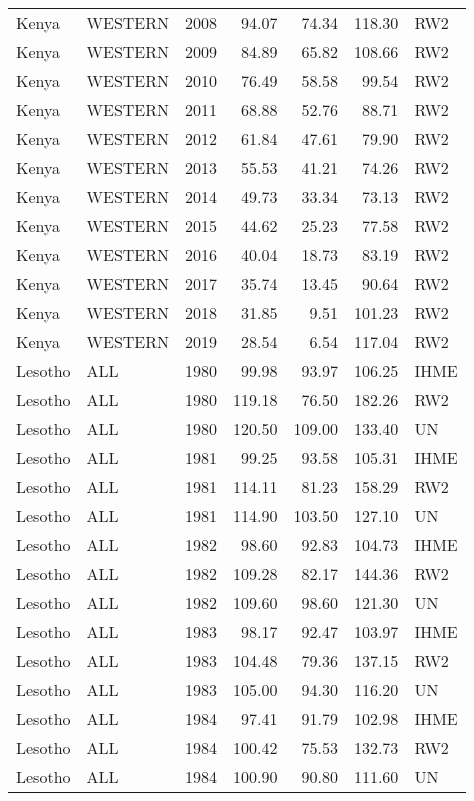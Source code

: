 \begin{longtable}{lllrrrl}
  Kenya & WESTERN & 2008 & 94.07 & 74.34 & 118.30 & RW2 \\ 
  Kenya & WESTERN & 2009 & 84.89 & 65.82 & 108.66 & RW2 \\ 
  Kenya & WESTERN & 2010 & 76.49 & 58.58 & 99.54 & RW2 \\ 
  Kenya & WESTERN & 2011 & 68.88 & 52.76 & 88.71 & RW2 \\ 
  Kenya & WESTERN & 2012 & 61.84 & 47.61 & 79.90 & RW2 \\ 
  Kenya & WESTERN & 2013 & 55.53 & 41.21 & 74.26 & RW2 \\ 
  Kenya & WESTERN & 2014 & 49.73 & 33.34 & 73.13 & RW2 \\ 
  Kenya & WESTERN & 2015 & 44.62 & 25.23 & 77.58 & RW2 \\ 
  Kenya & WESTERN & 2016 & 40.04 & 18.73 & 83.19 & RW2 \\ 
  Kenya & WESTERN & 2017 & 35.74 & 13.45 & 90.64 & RW2 \\ 
  Kenya & WESTERN & 2018 & 31.85 & 9.51 & 101.23 & RW2 \\ 
  Kenya & WESTERN & 2019 & 28.54 & 6.54 & 117.04 & RW2 \\ 
  Lesotho & ALL & 1980 & 99.98 & 93.97 & 106.25 & IHME \\ 
  Lesotho & ALL & 1980 & 119.18 & 76.50 & 182.26 & RW2 \\ 
  Lesotho & ALL & 1980 & 120.50 & 109.00 & 133.40 & UN \\ 
  Lesotho & ALL & 1981 & 99.25 & 93.58 & 105.31 & IHME \\ 
  Lesotho & ALL & 1981 & 114.11 & 81.23 & 158.29 & RW2 \\ 
  Lesotho & ALL & 1981 & 114.90 & 103.50 & 127.10 & UN \\ 
  Lesotho & ALL & 1982 & 98.60 & 92.83 & 104.73 & IHME \\ 
  Lesotho & ALL & 1982 & 109.28 & 82.17 & 144.36 & RW2 \\ 
  Lesotho & ALL & 1982 & 109.60 & 98.60 & 121.30 & UN \\ 
  Lesotho & ALL & 1983 & 98.17 & 92.47 & 103.97 & IHME \\ 
  Lesotho & ALL & 1983 & 104.48 & 79.36 & 137.15 & RW2 \\ 
  Lesotho & ALL & 1983 & 105.00 & 94.30 & 116.20 & UN \\ 
  Lesotho & ALL & 1984 & 97.41 & 91.79 & 102.98 & IHME \\ 
  Lesotho & ALL & 1984 & 100.42 & 75.53 & 132.73 & RW2 \\ 
  Lesotho & ALL & 1984 & 100.90 & 90.80 & 111.60 & UN \\ 

\end{longtable}
